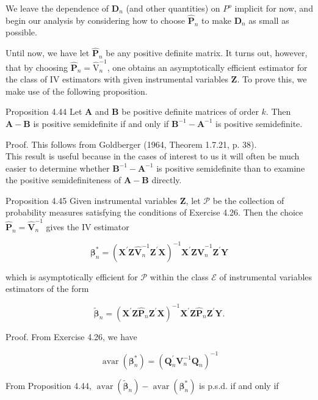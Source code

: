 \documentclass[10pt]{article}
\begin{document}
We leave the dependence of $\mathbf{D}_{n}$ (and other quantities) on $P^{o}$ implicit for now, and begin our analysis by considering how to choose $\hat{\mathbf{P}}_{n}$ to make $\mathbf{D}_{n}$ as small as possible.

Until now, we have let $\hat{\mathbf{P}}_{n}$ be any positive definite matrix. It turns out, however, that by choosing $\hat{\mathbf{P}}_{n}=\hat{\mathrm{V}}_{n}^{-1}$, one obtains an asymptotically efficient estimator for the class of IV estimators with given instrumental variables $\mathbf{Z}$. To prove this, we make use of the following proposition.

Proposition 4.44 Let $\mathbf{A}$ and $\mathbf{B}$ be positive definite matrices of order $k$. Then $\mathbf{A}-\mathbf{B}$ is positive semidefinite if and only if $\mathbf{B}^{-1}-\mathbf{A}^{-1}$ is positive semidefinite.

Proof. This follows from Goldberger (1964, Theorem 1.7.21, p. 38).\\
This result is useful because in the cases of interest to us it will often be much easier to determine whether $\mathbf{B}^{-1}-\mathbf{A}^{-1}$ is positive semidefinite than to examine the positive semidefiniteness of $\mathbf{A}-\mathbf{B}$ directly.

Proposition 4.45 Given instrumental variables $\mathbf{Z}$, let $\mathcal{P}$ be the collection of probability measures satisfying the conditions of Exercise 4.26. Then the choice $\hat{\mathbf{P}}_{n}=\hat{\mathbf{V}}_{n}^{-1}$ gives the IV estimator

$$
\boldsymbol{\beta}_{n}^{*}=\left(\mathbf{X}^{\prime} \mathbf{Z} \hat{\mathbf{V}}_{n}^{-1} \mathbf{Z}^{\prime} \mathbf{X}\right)^{-1} \mathbf{X}^{\prime} \mathbf{Z} \hat{\mathbf{V}}_{n}^{-1} \mathbf{Z}^{\prime} \mathbf{Y}
$$

which is asymptotically efficient for $\mathcal{P}$ within the class $\mathcal{E}$ of instrumental variables estimators of the form

$$
\tilde{\boldsymbol{\beta}}_{n}=\left(\mathbf{X}^{\prime} \mathbf{Z} \hat{\mathbf{P}}_{n} \mathbf{Z}^{\prime} \mathbf{X}\right)^{-1} \mathbf{X}^{\prime} \mathbf{Z} \hat{\mathbf{P}}_{n} \mathbf{Z}^{\prime} \mathbf{Y} .
$$

Proof. From Exercise 4.26, we have

$$
\operatorname{avar}\left(\boldsymbol{\beta}_{n}^{*}\right)=\left(\mathbf{Q}_{n}^{\prime} \mathbf{V}_{n}^{-1} \mathbf{Q}_{n}\right)^{-1}
$$

From Proposition 4.44, $\operatorname{avar}\left(\tilde{\boldsymbol{\beta}}_{n}\right)-\operatorname{avar}\left(\boldsymbol{\beta}_{n}^{*}\right)$ is p.s.d. if and only if
\end{document}
